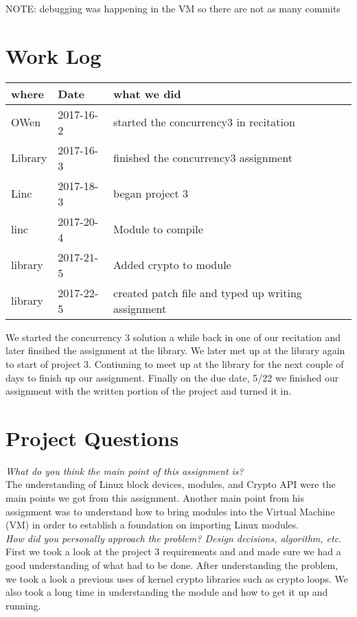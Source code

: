 \documentclass[letterpaper,10pt,titlepage]{article}
\begin{document}
NOTE: debugging was happening in the VM so there are not as many commits

\section{Work Log}
\begin{tabular}{lll} \textbf{where}
     & \textbf{Date}
     & \textbf{what we did}

\\ \hline
OWen & 2017-16-2 & started the concurrency3 in recitation  \\ \hline
Library & 2017-16-3 & finished the concurrency3 assignment \\ \hline
Linc & 2017-18-3 &  began project 3\\ \hline
linc & 2017-20-4 &  Module to compile\\ \hline
library & 2017-21-5 &  Added crypto to module\\ \hline
library & 2017-22-5 &  created patch file and typed up writing assignment\\ \hline
\end{tabular}

We started the concurrency 3 solution a while back in one of our recitation and later finsihed the assignment at the library. We later met up at the library again to start of project 3. Contiuning to meet up at the library for the next couple of days to finish up our assignment. Finally on the due date, 5/22 we finished our assignment with the written portion of the project and turned it in.

\section{Project Questions}

\textit{What do you think the main point of this assignment is?}\\

The understanding of Linux block devices, modules, and Crypto API were the main points we got from this assignment. Another main point from his assignment was to understand how to bring modules into the Virtual Machine (VM) in order to  establish a foundation on importing Linux modules.\\

\textit{How did you personally approach the problem? Design decisions, algorithm, etc.}\\

First we took a look at the project 3 requirements and and made sure we had a good understanding of what had to be done. After understanding the problem, we took a look a previous uses of kernel crypto libraries such as crypto loops. We also took a long time in understanding the module and how to get it up and running.\\
\end{document}

